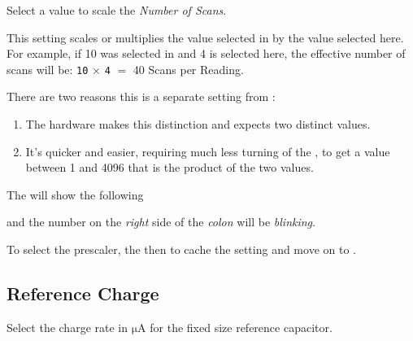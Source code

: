 Select a value to scale the \textit{Number of Scans}.

\par\medskip

This setting scales or multiplies the value selected in  by the value
selected here.  For example, if \num{10} was selected in  and \num{4}
is selected here, the effective number of scans will be:
\texttt{10} \textbf{$\times$} \texttt{4} $=$ \num{40} Scans per Reading.

\par\medskip

There are two reasons this is a separate setting from :

\begin{enumerate}
  \item The hardware makes this distinction and expects two distinct values.
  \item It's quicker and easier, requiring much less turning of the ,
    to get a value between \num{1} and \num{4096} that is the product of the
    two values.
\end{enumerate}

The  will show the following


and the number on the \textit{right} side of the \textit{colon} will be
\textit{blinking}.

\par\medskip

To select the prescaler,  the  then  to cache the setting
and move on to .


\subsection{Reference Charge} 

Select the charge rate in $\mathrm{\mu A}$ for the fixed size reference
capacitor.

\par\medskip

